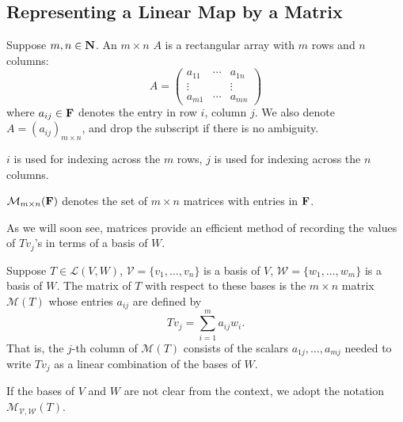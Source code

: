 \subsection{Representing a Linear Map by a Matrix}
\begin{definition}[Matrix]
Suppose $m,n\in\mathbf N$. An $m\times n$  $A$ is a rectangular array with $m$ rows and $n$ columns:
\[A=\begin{pmatrix}
a_{11} & \cdots & a_{1n}\\
\vdots & & \vdots\\
a_{m1} & \cdots & a_{mn}
\end{pmatrix}\]
where $a_{ij}\in\mathbf F$ denotes the entry in row $i$, column $j$. We also denote $A=(a_{ij})_{m\times n}$, and drop the subscript if there is no ambiguity.
\end{definition}

\begin{notation}
$i$ is used for indexing across the $m$ rows, $j$ is used for indexing across the $n$ columns.
\end{notation}

\begin{notation}
$\mathcal{M}_{m\times n}(\mathbf F)$ denotes the set of $m\times n$ matrices with entries in $\mathbf F$.
\end{notation}

As we will soon see, matrices provide an efficient method of recording the values of $Tv_j$'s in terms of a basis of $W$.

\begin{definition}
Suppose $T\in\mathcal{L}(V,W)$, $\mathcal{V}=\{v_1,\dots,v_n\}$ is a basis of $V$, $\mathcal{W}=\{w_1,\dots,w_m\}$ is a basis of $W$. The matrix of $T$ with respect to these bases is the $m\times n$ matrix $\mathcal{M}(T)$ whose entries $a_{ij}$ are defined by
\[Tv_j=\sum_{i=1}^{m}a_{ij}w_i.\]
That is, the $j$-th column of $\mathcal{M}(T)$ consists of the scalars $a_{1j},\dots,a_{mj}$ needed to write $Tv_j$ as a linear combination of the bases of $W$.
\end{definition}

\begin{notation}
If the bases of $V$ and $W$ are not clear from the context, we adopt the notation $\mathcal{M}_{\mathcal{V},\mathcal{W}}(T)$.
\end{notation}



